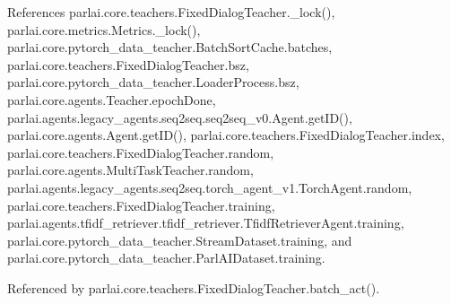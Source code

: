 References parlai.\+core.\+teachers.\+Fixed\+Dialog\+Teacher.\+\_\+lock(), parlai.\+core.\+metrics.\+Metrics.\+\_\+lock(), parlai.\+core.\+pytorch\+\_\+data\+\_\+teacher.\+Batch\+Sort\+Cache.\+batches, parlai.\+core.\+teachers.\+Fixed\+Dialog\+Teacher.\+bsz, parlai.\+core.\+pytorch\+\_\+data\+\_\+teacher.\+Loader\+Process.\+bsz, parlai.\+core.\+agents.\+Teacher.\+epoch\+Done, parlai.\+agents.\+legacy\+\_\+agents.\+seq2seq.\+seq2seq\+\_\+v0.\+Agent.\+get\+I\+D(), parlai.\+core.\+agents.\+Agent.\+get\+I\+D(), parlai.\+core.\+teachers.\+Fixed\+Dialog\+Teacher.\+index, parlai.\+core.\+teachers.\+Fixed\+Dialog\+Teacher.\+random, parlai.\+core.\+agents.\+Multi\+Task\+Teacher.\+random, parlai.\+agents.\+legacy\+\_\+agents.\+seq2seq.\+torch\+\_\+agent\+\_\+v1.\+Torch\+Agent.\+random, parlai.\+core.\+teachers.\+Fixed\+Dialog\+Teacher.\+training, parlai.\+agents.\+tfidf\+\_\+retriever.\+tfidf\+\_\+retriever.\+Tfidf\+Retriever\+Agent.\+training, parlai.\+core.\+pytorch\+\_\+data\+\_\+teacher.\+Stream\+Dataset.\+training, and parlai.\+core.\+pytorch\+\_\+data\+\_\+teacher.\+Parl\+A\+I\+Dataset.\+training.



Referenced by parlai.\+core.\+teachers.\+Fixed\+Dialog\+Teacher.\+batch\+\_\+act().

